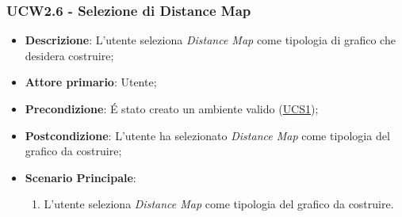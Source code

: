 \subsubsection{UCW2.6 - Selezione di Distance Map}
\label{ssub:ucw2.6}
\begin{itemize}
	\item \textbf{Descrizione}: L’utente seleziona \emph{Distance Map} come tipologia di grafico che desidera 
	costruire;
	\item \textbf{Attore primario}:	Utente;
	\item \textbf{Precondizione}:	É stato creato un ambiente valido (\hyperref[sub:ucs1]{UCS1});

    \item \textbf{Postcondizione}:  L'utente ha selezionato \emph{Distance Map} come tipologia del grafico da 
	costruire;

	\item \textbf{Scenario Principale}: 
	\begin{enumerate}
		\item L'utente seleziona \emph{Distance Map} come tipologia del grafico da costruire.
	\end{enumerate}
\end{itemize}
